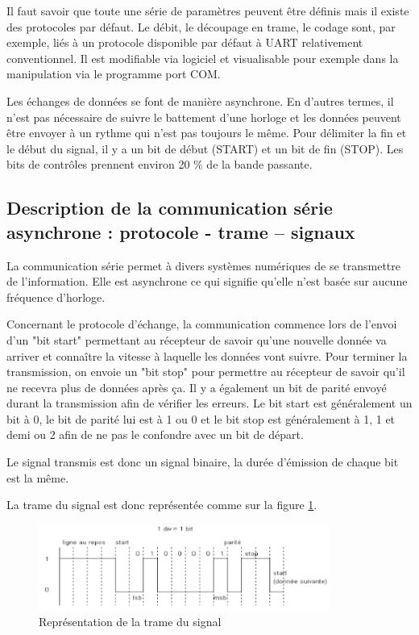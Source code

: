 \documentclass[a4paper]{article}
\begin{document}
Il faut savoir que toute une série de paramètres peuvent être définis mais il existe des protocoles par défaut. Le débit, le découpage en trame, le codage sont, par exemple, liés à un protocole disponible par défaut à UART relativement conventionnel. Il est modifiable via logiciel et visualisable pour exemple dans la manipulation via le programme port COM.

Les échanges de données se font de manière asynchrone. En d’autres termes, il n’est pas nécessaire de suivre le battement d’une horloge et les données peuvent être envoyer à un rythme qui n’est pas toujours le même. Pour délimiter la fin et le début du signal, il y a un bit de début (START) et un bit de fin (STOP). Les bits de contrôles prennent environ 20 \%  de la bande passante.










\subsection{Description de la communication série asynchrone : protocole - trame – signaux}





La communication série permet à divers systèmes numériques de se transmettre de l’information. Elle est asynchrone ce qui signifie qu’elle n’est basée sur aucune fréquence d’horloge. 

Concernant le protocole d’échange, la communication commence lors de l’envoi d’un "bit start" permettant au récepteur de savoir qu’une nouvelle donnée va arriver et connaître la vitesse à laquelle les données vont suivre. Pour terminer la transmission, on envoie un "bit stop" pour permettre au récepteur de savoir qu’il ne recevra plus de données après ça. Il y a également un bit de parité envoyé durant la transmission afin de vérifier les erreurs. Le bit start est généralement un bit à 0, le bit de parité lui est à 1 ou 0 et le bit stop est généralement à 1, 1 et demi ou 2 afin de ne pas le confondre avec un bit de départ.

Le signal transmis est donc un signal binaire, la durée d’émission de chaque bit est la même.

La trame du signal est donc représentée comme sur la figure \ref{fig:RepresentationTrameSignal}.

\begin{figure}[H]
    \centering
    \includegraphics[width=0.85\textwidth]{images/RepresentationTrameSignal.PNG}
    \caption{Représentation de la trame du signal}
    \label{fig:RepresentationTrameSignal}
\end{figure}
\end{document}

